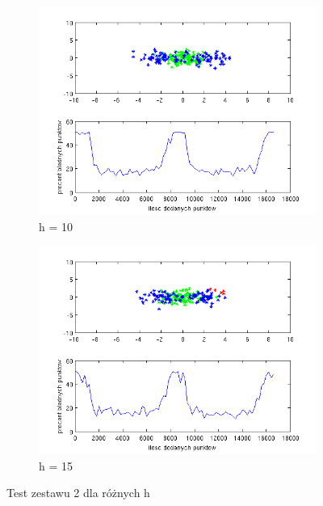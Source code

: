 \documentclass[10pt,a4paper]{article}
\begin{document}
\begin{figure}[H]
     \begin{subfigure}[b]{0.5\textwidth}
    \includegraphics[width=\textwidth]{test2_h10.png}
    \caption{h = 10}
  \end{subfigure}
  \hfill
  \begin{subfigure}[b]{0.5\textwidth}
    \includegraphics[width=\textwidth]{test2_h15.png}
    \caption{h = 15}
  \end{subfigure}
  
  \caption{Test zestawu 2 dla różnych h}
  \label{test_h2}
  
\end{figure}
\end{document}
